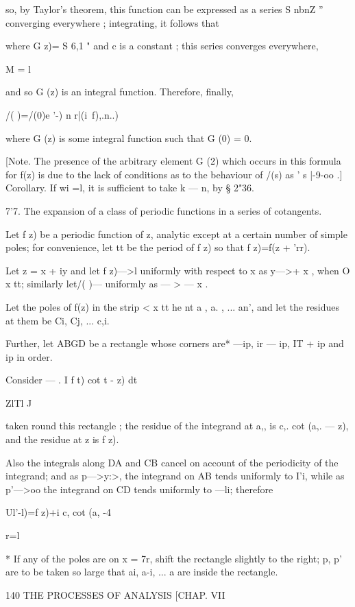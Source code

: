 {so, by Taylor's theorem, this function can be expressed as a series S nbnZ ''~  
converging everywhere ; integrating, it follows that 

where G z)= S 6,1 " and c is a constant ; this series converges everywhere, 

M = l 

and so G (z) is an integral function. 
Therefore, finally, 

/( )=/(0)e '-) n r|(i\ f),.n..) 

where G (z) is some integral function such that G (0) = 0. 

[Note. The presence of the arbitrary element G (2) which occurs in this formula for 
f(z) is due to the lack of conditions as to the behaviour of /(s) as ' s |-9-oo .] 
Corollary. If wi =l, it is sufficient to take k  — n, by § 2"36. 

7'7. The expansion of a class of periodic functions in a series of 
cotangents. 

Let f z) be a periodic function of z, analytic except at a certain number 
of simple poles; for convenience, let tt be the period of f z) so that 
f z)=f(z + 'rr). 

Let z = x + iy and let f z)—>l uniformly with respect to x as y—>+ x , 
when O x tt; similarly let/( )—   uniformly as  — > — x . 

Let the poles of f(z) in the strip < x  tt he nt a , a. , ... an', and let the 
residues at them be Ci, Cj, ... c,i. 

Further, let ABGD be a rectangle whose corners are* —ip, ir — ip, 
IT + ip and ip in order. 

Consider   — . I f t) cot  t - z) dt 

ZlTl J 

taken round this rectangle ; the residue of the integrand at a,, is c,. cot (a,. — z), 
and the residue at z is f z). 

Also the integrals along DA and CB cancel on account of the periodicity 
of the integrand; and as p—>y:>, the integrand on AB tends uniformly to I'i, 
while as p'—>oo the integrand on CD tends uniformly to —li; therefore 

Ul'-l)=f z)+i c, cot (a, -4 

r=l 

* If any of the poles are on x = 7r, shift the rectangle slightly to the right; p, p' are to be 
taken so large that ai, a-i, ... a  are inside the rectangle. 



140 THE PROCESSES OF ANALYSIS [CHAP. VII 

}

